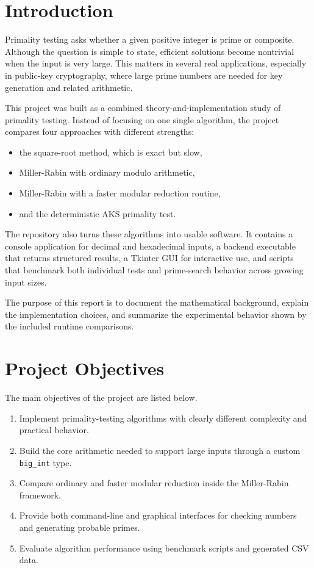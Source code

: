 \documentclass[12pt,a4paper]{report}
\begin{document}
\clearpage
{}

\chapter{Introduction}
Primality testing asks whether a given positive integer is prime or composite. Although the question is simple to state, efficient solutions become nontrivial when the input is very large. This matters in several real applications, especially in public-key cryptography, where large prime numbers are needed for key generation and related arithmetic.

This project was built as a combined theory-and-implementation study of primality testing. Instead of focusing on one single algorithm, the project compares four approaches with different strengths:
\begin{itemize}
    \item the square-root method, which is exact but slow,
    \item Miller-Rabin with ordinary modulo arithmetic,
    \item Miller-Rabin with a faster modular reduction routine,
    \item and the deterministic AKS primality test.
\end{itemize}

The repository also turns these algorithms into usable software. It contains a console application for decimal and hexadecimal inputs, a backend executable that returns structured results, a Tkinter GUI for interactive use, and scripts that benchmark both individual tests and prime-search behavior across growing input sizes.

The purpose of this report is to document the mathematical background, explain the implementation choices, and summarize the experimental behavior shown by the included runtime comparisons.

\chapter{Project Objectives}
The main objectives of the project are listed below.
\begin{enumerate}
    \item Implement primality-testing algorithms with clearly different complexity and practical behavior.
    \item Build the core arithmetic needed to support large inputs through a custom \texttt{big\_int} type.
    \item Compare ordinary and faster modular reduction inside the Miller-Rabin framework.
    \item Provide both command-line and graphical interfaces for checking numbers and generating probable primes.
    \item Evaluate algorithm performance using benchmark scripts and generated CSV data.
\end{enumerate}
\end{document}
